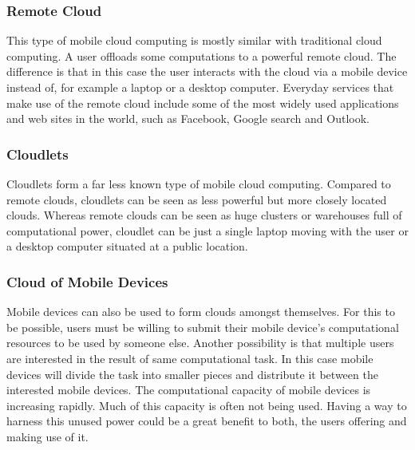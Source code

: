 \documentclass[conference]{IEEEtran}
\begin{document}
\subsubsection{Remote Cloud}
This type of mobile cloud computing is mostly similar with traditional cloud computing. A user offloads some computations to a powerful remote cloud. The difference is that in this case the user interacts with the cloud via a mobile device instead of, for example a laptop or a desktop computer. Everyday services that make use of the remote cloud include some of the most widely used applications and web sites in the world, such as Facebook, Google search and Outlook.

\subsubsection{Cloudlets}
Cloudlets form a far less known type of mobile cloud computing. Compared to remote clouds, cloudlets can be seen as less powerful but more closely located clouds. Whereas remote clouds can be seen as huge clusters or warehouses full of computational power, cloudlet can be just a single laptop moving with the user or a desktop computer situated at a public location.

\subsubsection{Cloud of Mobile Devices}
Mobile devices can also be used to form clouds amongst themselves. For this to be possible, users must be willing to submit their mobile device's computational resources to be used by someone else. Another possibility is that multiple users are interested in the result of same computational task. In this case mobile devices will divide the task into smaller pieces and distribute it between the interested mobile devices. The computational capacity of mobile devices is increasing rapidly. Much of this capacity is often not being used. Having a way to harness this unused power could be a great benefit to both, the users offering and making use of it.\\
\end{document}
